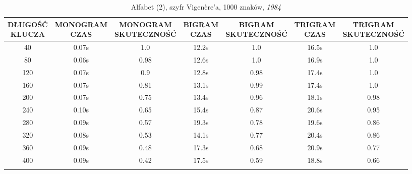 \documentclass[a4paper]{article}
\theoremstyle{defn}
\theoremstyle{theorem}
\theoremstyle{lemma}
\theoremstyle{cor}
\theoremstyle{fact}
\begin{document}
\begin{center}\begin{small}\begin{longtable}{|c|c|c|c|c|c|c|} 
\hline \makecell{DŁUGOŚĆ\\KLUCZA} &  \makecell{MONOGRAM\\CZAS} & \makecell{MONOGRAM\\SKUTECZNOŚĆ} & \makecell{BIGRAM\\CZAS} &  \makecell{BIGRAM\\SKUTECZNOŚĆ} & \makecell{TRIGRAM\\CZAS} & \makecell{TRIGRAM\\SKUTECZNOŚĆ}\\ \hline 
40 & 0.07s & 1.0 & 12.2s & 1.0 & 16.5s & 1.0 \\ \hline 
80 & 0.06s & 0.98 & 12.6s & 1.0 & 16.9s & 1.0 \\ \hline 
120 & 0.07s & 0.9 & 12.8s & 0.98 & 17.4s & 1.0 \\ \hline 
160 & 0.07s & 0.81 & 13.1s & 0.99 & 17.4s & 1.0 \\ \hline 
200 & 0.07s & 0.75 & 13.4s & 0.96 & 18.1s & 0.98 \\ \hline 
240 & 0.10s & 0.65 & 15.4s & 0.87 & 20.6s & 0.95 \\ \hline 
280 & 0.09s & 0.57 & 19.3s & 0.78 & 19.6s & 0.86 \\ \hline 
320 & 0.08s & 0.53 & 14.1s & 0.77 & 20.4s & 0.86 \\ \hline 
360 & 0.09s & 0.48 & 17.3s & 0.68 & 20.9s & 0.77 \\ \hline 
400 & 0.09s & 0.42 & 17.5s & 0.59 & 18.8s & 0.66 \\ \hline 
\caption{Alfabet (2), szyfr Vigenère'a, 1000 znaków, \textit{1984}}
\end{longtable}\end{small}\end{center} 
\end{document}
